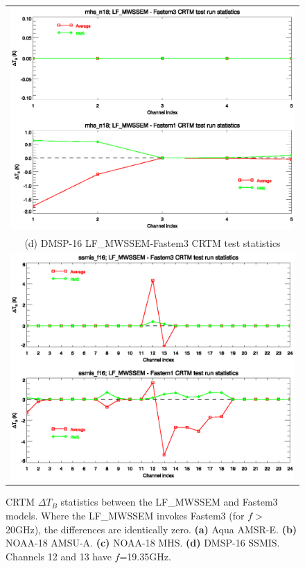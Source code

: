 \begin{figure}[htp]
\begin{tabular}{c}
    \includegraphics[bb=85 401 540 556,clip,scale=0.8]{graphics/Comparison/mhs_n18.TBstats.eps}\\
    \textsf{(d) DMSP-16 LF\_MWSSEM-Fastem3 CRTM test statistics}\\
    \includegraphics[bb=85 401 540 556,clip,scale=0.8]{graphics/Comparison/ssmis_f16.TBstats.eps}
  \end{tabular}
  \caption{CRTM $\Delta T_B$ statistics between the LF\_MWSSEM and Fastem3 models. Where the LF\_MWSSEM invokes Fastem3 (for $f\!>$20GHz), the differences are identically zero. \textbf{(a)} Aqua AMSR-E. \textbf{(b)} NOAA-18 AMSU-A. \textbf{(c)} NOAA-18 MHS. \textbf{(d)} DMSP-16 SSMIS. Channels 12 and 13 have $f$=19.35GHz.}
  \label{fig:LF_MWSSEM-Fastem3.TBstats}
\end{figure}


